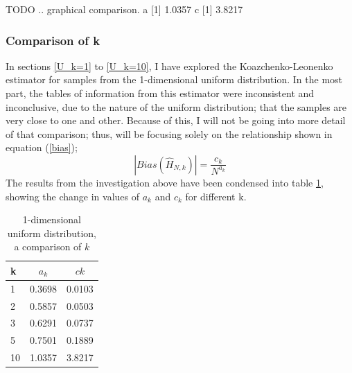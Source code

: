 \documentclass{article}
\begin{document}
TODO ..  graphical comparison.
a
[1] 1.0357
c
[1] 3.8217



\subsubsection{Comparison of k} \label{U_compare_k}
In sections \ref{U_k=1} to \ref{U_k=10}, I have explored the Koazchenko-Leonenko estimator for samples from the 1-dimensional uniform distribution. In the most part, the tables of information from this estimator were inconsistent and inconclusive, due to the nature of the uniform distribution; that the samples are very close to one and other. Because of this, I will not be going into more detail of that comparison; thus, will be focusing solely on the relationship shown in equation (\ref{bias});
\begin{equation}
|Bias(\hat{H}_{N, k})| = \frac{c_{k}}{N^{a_{k}}} \nonumber
\end{equation}
The results from the investigation above have been condensed into table \ref{uniform_k_comparison_table}, showing the change in values of $a_{k}$ and $c_{k}$ for different {k}.

\begin{table}
\caption{1-dimensional uniform distribution, a comparison of $k$} \label{uniform_k_comparison_table}
\begin{center}
\begin{tabular}{| l | c c|} 
\toprule
k & $a_{k}$ & $c{k}$ \\
\midrule[1pt]
1 & 0.3698 & 0.0103 \\
2 & 0.5857 & 0.0503 \\
3 & 0.6291 & 0.0737 \\
5 & 0.7501 & 0.1889 \\
10 & 1.0357 &  3.8217 \\
\hline
\end{tabular}
\end{center}
\end{table}
\end{document}
